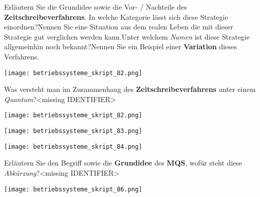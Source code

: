 \documentclass{article}
\begin{document}
\begin{tcolorbox}[colback=white!10!white,colframe=lightgray!75!black,
  savelowerto=\jobname_ex.tex,breakable,enhanced,lines before break=40]

\justifying
Erläutern Sie die Grundidee sowie die Vor- / Nachteile des \textbf{Zeitschreibeverfahrens}. In welche Kategorie lässt sich diese Strategie einordnen?Nennen Sie eine Situation aus dem realen Leben die mit dieser Strategie gut verglichen werden kann.Unter welchem \textit{Namen} ist diese Strategie allgemeinhin noch bekannt?Nennen Sie ein Beispiel einer \textbf{Variation} dieses Verfahrens.

\tcblower

\justifying
\begin{center}
\texttt{[image: betriebssysteme\_skript\_82.png]}
\end{center}

\end{tcolorbox}
\begin{tcolorbox}[colback=white!10!white,colframe=lightgray!75!black,
  savelowerto=\jobname_ex.tex,breakable,enhanced,lines before break=40]

\justifying
Was versteht man im Zusammenhang des \textbf{Zeitschreibeverfahrens} unter einem \textit{Quantum}?<missing IDENTIFIER>

\tcblower

\justifying
\begin{center}
\texttt{[image: betriebssysteme\_skript\_82.png]}
\end{center}
\begin{center}
\texttt{[image: betriebssysteme\_skript\_83.png]}
\end{center}
\begin{center}
\texttt{[image: betriebssysteme\_skript\_84.png]}
\end{center}

\end{tcolorbox}
\begin{tcolorbox}[colback=white!10!white,colframe=lightgray!75!black,
  savelowerto=\jobname_ex.tex,breakable,enhanced,lines before break=40]

\justifying
Erläutern Sie den Begriff sowie die \textbf{Grundidee} des \textbf{MQS}, wofür steht diese \textit{Abkürzung}?<missing IDENTIFIER>

\tcblower

\justifying
\begin{center}
\texttt{[image: betriebssysteme\_skript\_86.png]}
\end{center}

\end{tcolorbox}
\end{document}
